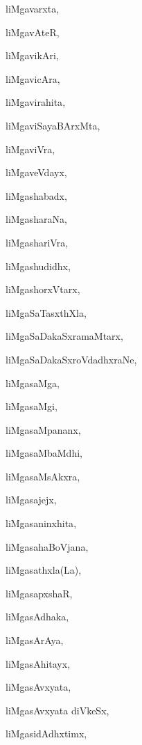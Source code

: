 \begin{multicols}{2}
{liMgavarxta}, \pageref{liMgavarxta}

{liMgavAteR}, \pageref{liMgavAteR}

{liMgavikAri}, \pageref{liMgavikAri}

{liMgavicAra}, \pageref{liMgavicAra}

{liMgavirahita}, \pageref{liMgavirahita}

{liMgaviSayaBArxMta}, \pageref{liMgaviSayaBArxMta}

{liMgaviVra}, \pageref{liMgaviVra}

{liMgaveVdayx}, \pageref{liMgaveVdayx}

{liMgashabadx}, \pageref{liMgashabadx}

{liMgasharaNa}, \pageref{liMgasharaNa}

{liMgashariVra}, \pageref{liMgashariVra}

{liMgashudidhx}, \pageref{liMgashudidhx}

{liMgashorxVtarx}, \pageref{liMgashorxVtarx}

{liMgaSaTasxthXla}, \pageref{liMgaSaTasxthXla}

{liMgaSaDakaSxramaMtarx}, \pageref{liMgaSaDakaSxramaMtarx}

{liMgaSaDakaSxroVdadhxraNe}, \pageref{liMgaSaDakaSxroVdadhxraNe}

{liMgasaMga}, \pageref{liMgasaMga}

{liMgasaMgi}, \pageref{liMgasaMgi}

{liMgasaMpananx}, \pageref{liMgasaMpananx}

{liMgasaMbaMdhi}, \pageref{liMgasaMbaMdhi}

{liMgasaMsAkxra}, \pageref{liMgasaMsAkxra}

{liMgasajejx}, \pageref{liMgasajejx}

{liMgasaninxhita}, \pageref{liMgasaninxhita}

{liMgasahaBoVjana}, \pageref{liMgasahaBoVjana}

{liMgasathxla(La)}, \pageref{liMgasathxla(La)}

{liMgasapxshaR}, \pageref{liMgasapxshaR}

{liMgasAdhaka}, \pageref{liMgasAdhaka}

{liMgasArAya}, \pageref{liMgasArAya}

{liMgasAhitayx}, \pageref{liMgasAhitayx}

{liMgasAvxyata}, \pageref{liMgasAvxyata}

{liMgasAvxyata diVkeSx}, \pageref{liMgasAvxyatadiVkeSx}

{liMgasidAdhxtimx}, \pageref{liMgasidAdhxtimx}


\end{multicols}
